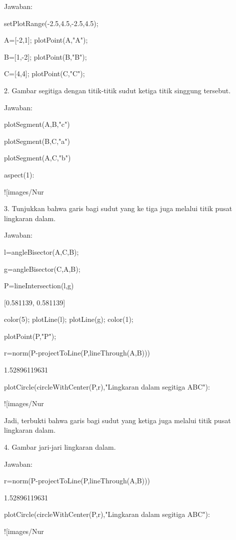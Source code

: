 \documentclass{article}
\begin{document}
Jawaban:


\>setPlotRange(-2.5,4.5,-2.5,4.5);

\>A=[-2,1]; plotPoint(A,"A");

\>B=[1,-2]; plotPoint(B,"B");

\>C=[4,4]; plotPoint(C,"C");


2. Gambar segitiga dengan titik-titik sudut ketiga titik singgung
tersebut.


Jawaban:


\>plotSegment(A,B,"c")

\>plotSegment(B,C,"a")

\>plotSegment(A,C,"b")

\>aspect(1):


![images/Nur%

3. Tunjukkan bahwa garis bagi sudut yang ke tiga juga melalui titik
pusat lingkaran dalam.


Jawaban:


\>l=angleBisector(A,C,B);

\>g=angleBisector(C,A,B);

\>P=lineIntersection(l,g)


    [0.581139,  0.581139]

\>color(5); plotLine(l); plotLine(g); color(1);

\>plotPoint(P,"P");

\>r=norm(P-projectToLine(P,lineThrough(A,B)))


    1.52896119631

\>plotCircle(circleWithCenter(P,r),"Lingkaran dalam segitiga ABC"):


![images/Nur%

Jadi, terbukti bahwa garis bagi sudut yang ketiga juga melalui titik
pusat lingkaran dalam.


4. Gambar jari-jari lingkaran dalam.


Jawaban:


\>r=norm(P-projectToLine(P,lineThrough(A,B)))


    1.52896119631

\>plotCircle(circleWithCenter(P,r),"Lingkaran dalam segitiga ABC"):


![images/Nur%
\end{document}
